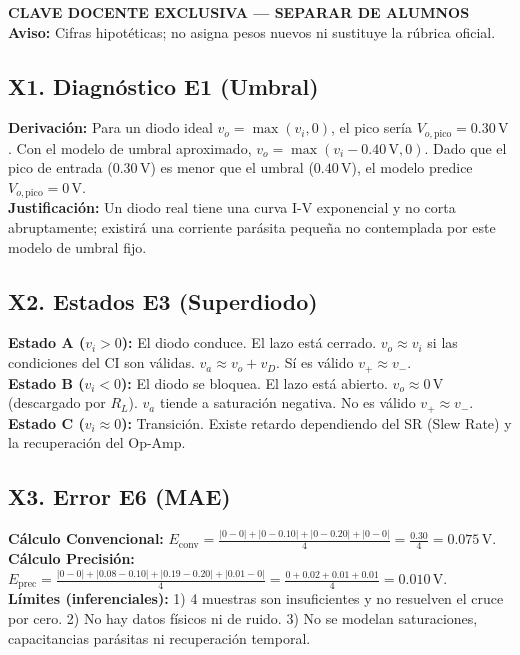 \documentclass[10pt, a4paper]{article}
\begin{document}
\begin{center}
    {\Large\textbf{\textcolor{red!70!black}{CLAVE DOCENTE EXCLUSIVA — SEPARAR DE ALUMNOS}}} \\[0.1cm]
    {\footnotesize\textbf{Aviso:} Cifras hipotéticas; no asigna pesos nuevos ni sustituye la rúbrica oficial.}
\end{center}

\subsection*{X1. Diagnóstico E1 (Umbral)}
\textbf{Derivación:} Para un diodo ideal $v_o = \max(v_i, 0)$, el pico sería $V_{o,\mathrm{pico}} = 0.30\,\mathrm{V}$. Con el modelo de umbral aproximado, $v_o = \max(v_i - 0.40\,\mathrm{V}, 0)$. Dado que el pico de entrada ($0.30\,\mathrm{V}$) es menor que el umbral ($0.40\,\mathrm{V}$), el modelo predice $V_{o,\mathrm{pico}} = 0\,\mathrm{V}$.\\
\textbf{Justificación:} Un diodo real tiene una curva I-V exponencial y no corta abruptamente; existirá una corriente parásita pequeña no contemplada por este modelo de umbral fijo.

\subsection*{X2. Estados E3 (Superdiodo)}
\textbf{Estado A ($v_i > 0$):} El diodo conduce. El lazo está cerrado. $v_o \approx v_i$ si las condiciones del CI son válidas. $v_a \approx v_o + v_D$. Sí es válido $v_+ \approx v_-$.\\
\textbf{Estado B ($v_i < 0$):} El diodo se bloquea. El lazo está abierto. $v_o \approx 0\,\mathrm{V}$ (descargado por $R_L$). $v_a$ tiende a saturación negativa. No es válido $v_+ \approx v_-$.\\
\textbf{Estado C ($v_i \approx 0$):} Transición. Existe retardo dependiendo del SR (Slew Rate) y la recuperación del Op-Amp.

\subsection*{X3. Error E6 (MAE)}
\textbf{Cálculo Convencional:} $E_{\mathrm{conv}} = \frac{|0-0| + |0-0.10| + |0-0.20| + |0-0|}{4} = \frac{0.30}{4} = \mathbf{0.075\,\mathrm{V}}$.\\
\textbf{Cálculo Precisión:} $E_{\mathrm{prec}} = \frac{|0-0| + |0.08-0.10| + |0.19-0.20| + |0.01-0|}{4} = \frac{0 + 0.02 + 0.01 + 0.01}{4} = \mathbf{0.010\,\mathrm{V}}$.\\
\textbf{Límites (inferenciales):} 1) 4 muestras son insuficientes y no resuelven el cruce por cero. 2) No hay datos físicos ni de ruido. 3) No se modelan saturaciones, capacitancias parásitas ni recuperación temporal.
\end{document}
